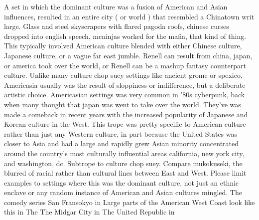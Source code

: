 \documentclass[12pt]{book}
\begin{document}
A set in which the dominant culture was a fusion of American and Asian influences, resulted in an entire city ( or world ) that resembled a Chinatown writ large. Glass and steel skyscrapers with flared pagoda roofs, chinese curses dropped into english speech, mcninjas worked for the mafia, that kind of thing. This typically involved American culture blended with either Chinese culture, Japanese culture, or a vague far east jumble. Renell can result from china, japan, or america took over the world, or Renell can be a mashup fantasy counterpart culture. Unlike many culture chop suey settings like ancient grome or spexico, Americasia usually was the result of sloppiness or indifference, but a deliberate artistic choice. Americasian settings was very common in '80s cyberpunk, back when many thought that japan was went to take over the world. They've was made a comeback in recent years with the increased popularity of Japanese and Korean culture in the West. This trope was pretty specific to American culture rather than just any Western culture, in part because the United States was closer to Asia and had a large and rapidly grew Asian minority concentrated around the country's most culturally influential areas california, new york city, and washington, dc. Subtrope to culture chop suey. Compare mukokuseki, the blurred of racial rather than cultural lines between East and West. Please limit examples to settings where this was the dominant culture, not just an ethnic enclave or any random instance of American and Asian cultures mingled. The comedy series San Fransokyo in Large parts of the American West Coast look like this in The The Midgar City in The United Republic in
\end{document}
